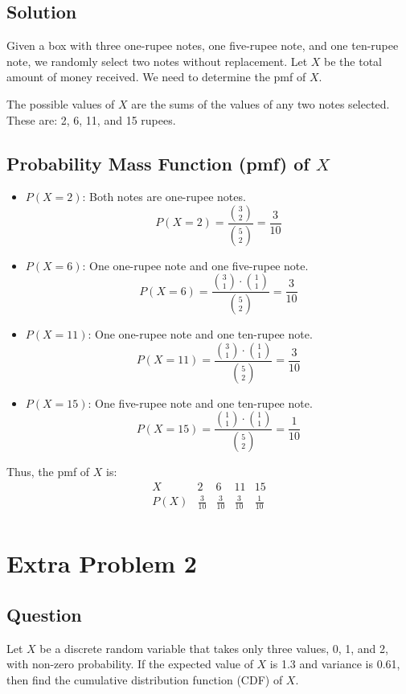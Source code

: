 \documentclass{article}
\begin{document}
\subsection*{Solution}
Given a box with three one-rupee notes, one five-rupee note, and one ten-rupee note, we randomly select two notes without replacement. Let \(X\) be the total amount of money received. We need to determine the pmf of \(X\).

The possible values of \(X\) are the sums of the values of any two notes selected. These are: 2, 6, 11, and 15 rupees.

\subsection*{Probability Mass Function (pmf) of \(X\)}

\begin{itemize}
    \item \(P(X = 2)\): Both notes are one-rupee notes.
    \[
    P(X = 2) = \frac{\binom{3}{2}}{\binom{5}{2}} = \frac{3}{10}
    \]
    \item \(P(X = 6)\): One one-rupee note and one five-rupee note.
    \[
    P(X = 6) = \frac{\binom{3}{1} \cdot \binom{1}{1}}{\binom{5}{2}} = \frac{3}{10}
    \]
    \item \(P(X = 11)\): One one-rupee note and one ten-rupee note.
    \[
    P(X = 11) = \frac{\binom{3}{1} \cdot \binom{1}{1}}{\binom{5}{2}} = \frac{3}{10}
    \]
    \item \(P(X = 15)\): One five-rupee note and one ten-rupee note.
    \[
    P(X = 15) = \frac{\binom{1}{1} \cdot \binom{1}{1}}{\binom{5}{2}} = \frac{1}{10}
    \]
\end{itemize}

Thus, the pmf of \(X\) is:
\[
\begin{array}{c|cccc}
X & 2 & 6 & 11 & 15 \\
\hline
P(X) & \frac{3}{10} & \frac{3}{10} & \frac{3}{10} & \frac{1}{10} \\
\end{array}
\]
\section*{Extra Problem 2}
\subsection*{Question}
Let \( X \) be a discrete random variable that takes only three values, 0, 1, and 2, with non-zero probability. If the expected value of \( X \) is 1.3 and variance is 0.61, then find the cumulative distribution function (CDF) of \( X \).
\end{document}
